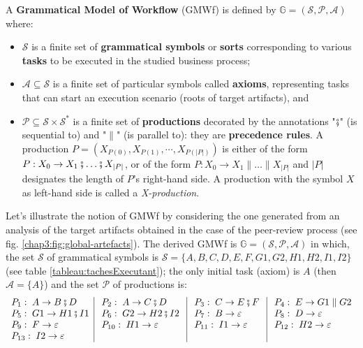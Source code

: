 \begin{definition}
	\label{defGMWf1}
	A \textbf{Grammatical Model of Workflow} (GMWf) is defined by $\mathbb{G}=\left(\mathcal{S},\mathcal{P},\mathcal{A}\right)$
	where:
	\begin{itemize}
	\item $\mathcal{S}$ is a finite set of \textbf{grammatical symbols} or \textbf{sorts} corresponding to various \textbf{tasks} to be executed in the studied business process; 
	\item $\mathcal{A}\subseteq\mathcal{S}$ is a finite set of particular symbols called \textbf{axioms}, representing tasks that can start an execution scenario (roots of target artifacts), and 
	\item $\mathcal{P}\subseteq\mathcal{S}\times\mathcal{S}^{*}$ is a finite set of \textbf{productions} decorated by the annotations "$\fatsemi$" (is sequential to) and "$\parallel$" (is parallel to): they are \textbf{precedence rules}. 
	A production $P=\left(X_{P(0)},X_{P(1)},\cdots, X_{P(|P|)}\right)$ is either of the form $P: X_0 \rightarrow X_1 \fatsemi \ldots \fatsemi X_{|P|}$, or of the form $P: X_0 \rightarrow X_1 \parallel \ldots \parallel X_{|P|}$ and $\left|P\right|$ 
	designates the length of $P$'s right-hand side.
	A production with the symbol $X$ as left-hand side is called a \textit{X-production}.
	\end{itemize}
\end{definition}

Let's illustrate the notion of GMWf by considering the one generated from an analysis of the target artifacts obtained in the case of the peer-review process (see fig. \ref{chap3:fig:global-artefacts}). The derived GMWf is  $\mathbb{G}=\left(\mathcal{S},\mathcal{P},\mathcal{A}\right)$ in which, the set $\mathcal{S}$ of grammatical symbols is
$\mathcal{S}=\{A, B, C, D, E, F, G1, G2, H1, H2, I1, I2\}$ (see table \ref{tableau:tachesExecutant});
the only initial task (axiom) is $A$ (then $\mathcal{A}=\{A\}$) and the set $\mathcal{P}$ of productions is:
\[ 
\begin{array}{l|l|l|l}
P_{1}:\; A\rightarrow B\fatsemi D & \; P_{2}:\; A\rightarrow C\fatsemi D\; & \; P_{3}:\; C\rightarrow E\fatsemi F\; & \; P_{4}:\; E\rightarrow G1\parallel G2    \\
P_{5}:\; G1\rightarrow H1 \fatsemi I1 & \; P_{6}:\; G2\rightarrow H2 \fatsemi I2\; & \; P_{7}:\; B\rightarrow \varepsilon\; & \; P_{8}:\; D\rightarrow \varepsilon  \\
P_{9}:\; F\rightarrow \varepsilon & \; P_{10}:\; H1\rightarrow \varepsilon & \; P_{11}:\; I1\rightarrow \varepsilon\; & \; P_{12}:\; H2\rightarrow \varepsilon  \\
P_{13}:\; I2\rightarrow \varepsilon &  &  &   \\
\end{array}
\]

